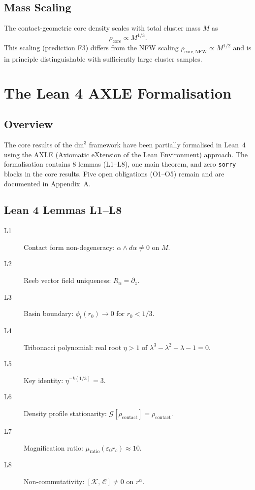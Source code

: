 \documentclass[11pt,a4paper,openright]{book}
\theoremstyle{dm3thm}
\theoremstyle{dm3def}
\newcommand{\dm}{\mathrm{dm}^3}
\newcommand{\eps}{\varepsilon_0}
\newcommand{\Ralf}{R_\alpha}
\newcommand{\rhocon}{\rho_{\mathrm{contact}}}
\newcommand{\rc}{r_c}
\newcommand{\etaT}{\eta}   %
\newcommand{\comm}[2]{[#1,\,#2]}
\newcommand{\GG}{\mathcal{G}}
\newcommand{\KK}{\mathcal{K}}
\newcommand{\CC}{\mathcal{C}}
\begin{document}
\section{Mass Scaling}

The contact-geometric core density scales with total cluster mass $M$ as
\begin{equation}\label{eq:massscaling}
  \rho_{\mathrm{core}} \propto M^{1/3}.
\end{equation}
This scaling (prediction F3) differs from the NFW scaling
$\rho_{\mathrm{core,NFW}} \propto M^{1/2}$ and is in principle distinguishable
with sufficiently large cluster samples.

\chapter{The Lean 4 AXLE Formalisation}
\label{ch:lean4}

\section{Overview}

The core results of the $\dm$ framework have been partially formalised in
Lean~4 using the AXLE (Axiomatic eXtension of the Lean Environment) approach.
The formalisation contains 8 lemmas (L1--L8), one main theorem, and zero
\texttt{sorry} blocks in the core results.  Five open obligations (O1--O5)
remain and are documented in Appendix~A.

\section{Lean 4 Lemmas L1--L8}

\begin{description}
  \item[L1] Contact form non-degeneracy: $\alpha\wedge d\alpha \neq 0$ on $M$.
  \item[L2] Reeb vector field uniqueness: $\Ralf = \partial_z$.
  \item[L3] Basin boundary: $\phi_t(r_0)\to 0$ for $r_0 < 1/3$.
  \item[L4] Tribonacci polynomial: real root $\etaT > 1$ of
    $\lambda^3-\lambda^2-\lambda-1=0$.
  \item[L5] Key identity: $\etaT^{-k(1/3)} = 3$.
  \item[L6] Density profile stationarity: $\GG[\rhocon] = \rhocon$.
  \item[L7] Magnification ratio: $\mu_{\mathrm{ratio}}(\eps\rc) \approx 10$.
  \item[L8] Non-commutativity: $\comm{\KK}{\CC} \neq 0$ on $r^\alpha$.
\end{description}
\end{document}
